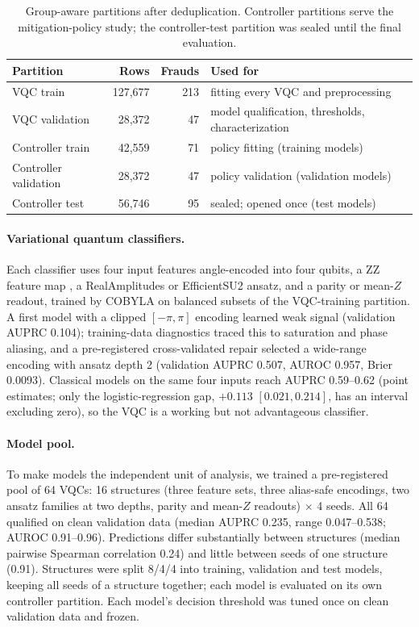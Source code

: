\documentclass[11pt]{article}
\begin{document}
\begin{table}[t]
\centering
\caption{Group-aware partitions after deduplication. Controller partitions serve the mitigation-policy study; the controller-test partition was sealed until the final evaluation.}
\label{tab:partitions}
\small
\begin{tabular}{lrrl}
\toprule
Partition & Rows & Frauds & Used for \\
\midrule
VQC train & 127{,}677 & 213 & fitting every VQC and preprocessing \\
VQC validation & 28{,}372 & 47 & model qualification, thresholds, characterization \\
Controller train & 42{,}559 & 71 & policy fitting (training models) \\
Controller validation & 28{,}372 & 47 & policy validation (validation models) \\
Controller test & 56{,}746 & 95 & sealed; opened once (test models) \\
\bottomrule
\end{tabular}
\end{table}

\paragraph{Variational quantum classifiers.}
Each classifier uses four input features angle-encoded into four qubits, a ZZ feature map \citep{havlicek2019supervised}, a RealAmplitudes or EfficientSU2 ansatz, and a parity or mean-$Z$ readout, trained by COBYLA on balanced subsets of the VQC-training partition.
A first model with a clipped $[-\pi,\pi]$ encoding learned weak signal (validation AUPRC 0.104); training-data diagnostics traced this to saturation and phase aliasing, and a pre-registered cross-validated repair selected a wide-range encoding with ansatz depth 2 (validation AUPRC 0.507, AUROC 0.957, Brier 0.0093).
Classical models on the same four inputs reach AUPRC 0.59--0.62 (point estimates; only the logistic-regression gap, $+0.113$ $[0.021, 0.214]$, has an interval excluding zero), so the VQC is a working but not advantageous classifier.

\paragraph{Model pool.}
To make models the independent unit of analysis, we trained a pre-registered pool of 64 VQCs: 16 structures (three feature sets, three alias-safe encodings, two ansatz families at two depths, parity and mean-$Z$ readouts) $\times$ 4 seeds.
All 64 qualified on clean validation data (median AUPRC 0.235, range 0.047--0.538; AUROC 0.91--0.96).
Predictions differ substantially between structures (median pairwise Spearman correlation 0.24) and little between seeds of one structure (0.91).
Structures were split 8/4/4 into training, validation and test models, keeping all seeds of a structure together; each model is evaluated on its own controller partition.
Each model's decision threshold was tuned once on clean validation data and frozen.
\end{document}
